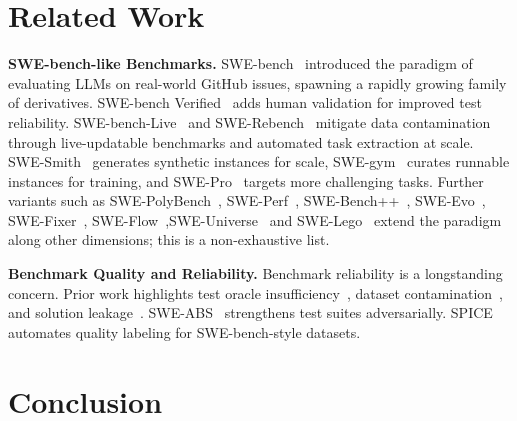 \documentclass[sigconf, review, anonymous]{acmart}
\begin{document}
    \section{Related Work}
    \label{sec:related}

    \textbf{SWE-bench-like Benchmarks.}\quad
    SWE-bench~\cite{swebench} introduced the paradigm of evaluating LLMs on real-world GitHub issues,        
  spawning a rapidly growing family of derivatives. SWE-bench Verified~\cite{swebenchverified} adds human
  validation for improved test reliability. SWE-bench-Live~\cite{swebenchlive} and                         
  SWE-Rebench~\cite{swerebench} mitigate data contamination through live-updatable benchmarks and automated
   task extraction at scale. SWE-Smith~\cite{swesmith} generates synthetic instances 
  for scale, SWE-gym~\cite{swegym} curates runnable instances for training, and                            
  SWE-Pro~\cite{deng2025swepro} targets more challenging tasks. Further variants such as                   
  SWE-PolyBench~\cite{swepoly}, SWE-Perf~\cite{he2025sweperf},
  SWE-Bench++~\cite{wang_swe-bench_2025}, SWE-Evo~\cite{thai_swe-evo_2025},
  SWE-Fixer~\cite{xie_swe-fixer_2025}, SWE-Flow~\cite{zhang_swe-flow_nodate},SWE-Universe~\cite{chen_swe-universe_2026} and SWE-Lego~\cite{tao_swe-lego_2026} extend the
  paradigm along other dimensions; this is a non-exhaustive list.

    \textbf{Benchmark Quality and Reliability.}\quad
    Benchmark reliability is a longstanding concern. Prior work highlights test oracle                       
  insufficiency~\cite{utboost,wang_are_2025}, dataset contamination~\cite{swebenchverifiednolonger}, and   
  solution leakage~\cite{aleithan_swe-bench_2024}. SWE-ABS~\cite{sweabs} strengthens test suites adversarially.                  
  SPICE~\cite{oliva_spice_2025} automates quality labeling for SWE-bench-style datasets. 
    \section{Conclusion}
    \label{sec:conclusion}
\end{document}
